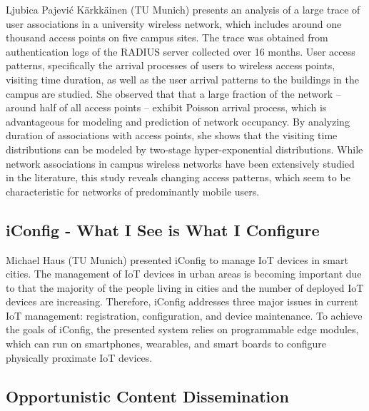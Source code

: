 Ljubica Pajević Kärkkäinen (TU Munich) presents an analysis of a large trace
of user associations in a university wireless network, which includes around
one thousand access points on five campus sites. The trace was obtained from
authentication logs of the RADIUS server collected over 16 months.  User
access patterns, specifically the arrival processes of users to wireless
access points, visiting time duration, as well as the user arrival patterns to
the buildings in the campus are studied. She observed that that a large
fraction of the network -- around half of all access points -- exhibit Poisson
arrival process, which is advantageous for modeling and prediction of network
occupancy. By analyzing duration of associations with access points, she shows
that the visiting time distributions can be modeled by two-stage
hyper-exponential distributions.  While network associations in campus
wireless networks have been extensively studied in the literature, this study
reveals changing access patterns, which seem to be characteristic for networks
of predominantly mobile users.

\subsection{iConfig - What I See is What I Configure}

Michael Haus (TU Munich) presented iConfig to manage \ac{IoT} devices in smart
cities. The management of \ac{IoT} devices in urban areas is becoming
important due to that the majority of the people living in cities and the
number of deployed \ac{IoT} devices are increasing. Therefore, iConfig
addresses three major issues in current \ac{IoT} management: registration,
configuration, and device maintenance. To achieve the goals of iConfig, the
presented system relies on programmable edge modules, which can run on
smartphones, wearables, and smart boards to configure physically proximate
\ac{IoT} devices.


\subsection{Opportunistic Content Dissemination}


